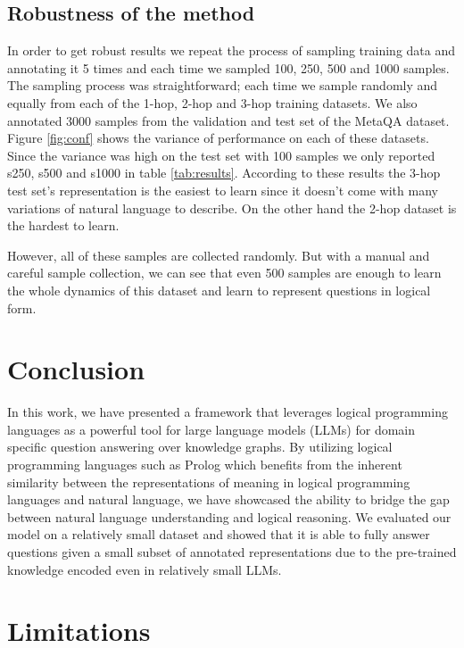\documentclass[11pt]{article}
\begin{document}
\subsection{Robustness of the method}
In order to get robust results we repeat the process of sampling training data and annotating it 5 times and each time we sampled 100, 250, 500 and 1000 samples. The sampling process was straightforward; each time we sample randomly and equally from each of the 1-hop, 2-hop and 3-hop training datasets. We also annotated 3000 samples from the validation and test set of the MetaQA dataset. Figure \ref{fig:conf} shows the variance of performance on each of these datasets. Since the variance was high on the test set with 100 samples we only reported s250, s500 and s1000 in table \ref{tab:results}. According to these results the 3-hop test set's representation is the easiest to learn since it doesn't come with many variations of natural language to describe. On the other hand the 2-hop dataset is the hardest to learn.

However, all of these samples are collected randomly. But with a manual and careful sample collection, we can see that even 500 samples are enough to learn the whole dynamics of this dataset and learn to represent questions in logical form.



\section{Conclusion}

In this work, we have presented a framework that leverages logical programming languages as a powerful tool for large language models (LLMs) for domain specific question answering over knowledge graphs. By utilizing logical programming languages such as Prolog which benefits from the inherent similarity between the representations of meaning in logical programming languages and natural language, we have showcased the ability to bridge the gap between natural language understanding and logical reasoning. We evaluated our model on a relatively small dataset and showed that it is able to fully answer questions given a small subset of annotated representations due to the pre-trained knowledge encoded even in relatively small LLMs.

\section{Limitations}
\end{document}
